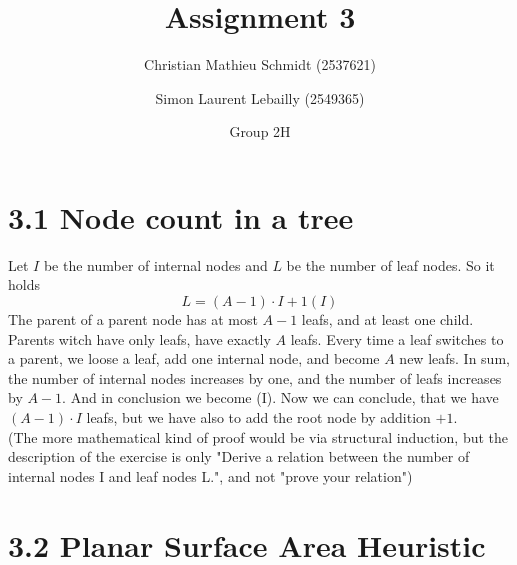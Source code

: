 \documentclass{article}
\title{Assignment 3}
\author{Christian Mathieu Schmidt (2537621)
\and Simon Laurent Lebailly (2549365)\\
\and Group 2H}
\begin{document}
\maketitle


\section*{3.1 Node count in a tree} \label{ex1}
    Let $I$ be the number of internal nodes and $L$ be the number of leaf nodes. So it holds
    $$L = (A-1) \cdot I + 1 (I)$$
    The parent of a parent node has at most $A-1$ leafs, and at least one child.
    Parents witch have only leafs, have exactly $A$ leafs.
    Every time a leaf switches to a parent, we loose a leaf, add one internal node, and become $A$ new leafs.
    In sum, the number of internal nodes increases by one, and the number of leafs increases by $A-1$.
    And in conclusion we become (I).
    Now we can conclude, that we have $(A-1) \cdot I$ leafs, but we have also to add the root node by addition $+1$.\\
    (The more mathematical kind of proof would be via structural induction, but the description of the exercise is only "Derive a relation between the number of internal nodes I and leaf nodes L.", and not "prove your relation")

\section*{3.2 Planar Surface Area Heuristic} \label{ex2}
    
\end{document}
